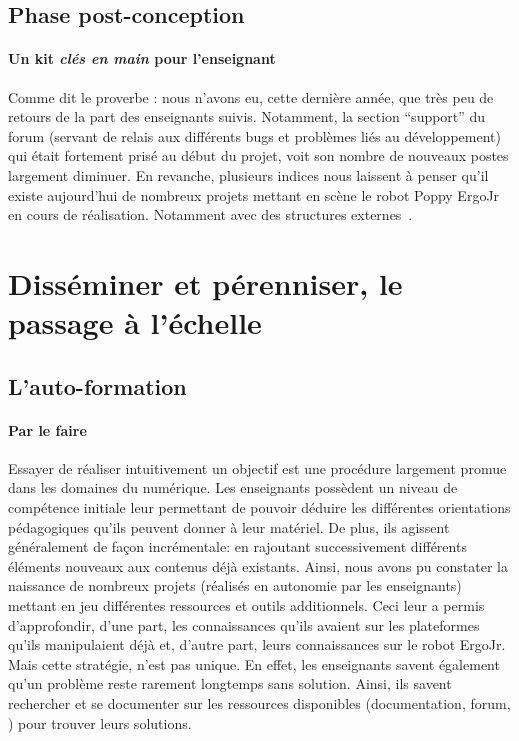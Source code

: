     \subsection{Phase post-conception}
      \paragraph{Un kit \textit{clés en main} pour l'enseignant}
        Comme dit le proverbe : nous n'avons eu, cette dernière année, que très peu de retours de la part des enseignants suivis. Notamment, la section “support” du forum (servant de relais aux différents bugs et problèmes liés au développement) qui était fortement prisé au début du projet, voit son nombre de nouveaux postes largement diminuer. En revanche, plusieurs indices nous laissent à penser qu'il existe aujourd'hui de nombreux projets mettant en scène le robot Poppy ErgoJr en cours de réalisation. Notamment avec des structures externes~.
\section[Disséminer et pérenniser]{Disséminer et pérenniser, le passage à l'échelle}
    \subsection{L'auto-formation}
        \paragraph{Par le faire}
            Essayer de réaliser intuitivement  un objectif est une procédure largement promue dans les domaines du numérique. Les enseignants possèdent un niveau de compétence initiale leur permettant de pouvoir déduire les différentes orientations pédagogiques qu'ils peuvent donner à leur matériel. De plus, ils agissent généralement de façon incrémentale: en rajoutant successivement différents éléments nouveaux aux contenus déjà existants. Ainsi, nous avons pu constater la naissance de nombreux projets (réalisés en autonomie par les enseignants) mettant en jeu différentes ressources et outils additionnels. Ceci leur a permis d'approfondir, d'une part, les connaissances qu'ils avaient sur les plateformes qu'ils manipulaient déjà et, d'autre part, leurs connaissances sur le robot ErgoJr. 
            Mais cette stratégie, n'est pas unique. En effet, les enseignants savent également qu'un problème reste rarement longtemps sans solution. Ainsi, ils savent rechercher et se documenter sur les ressources disponibles (documentation, forum, \etc) pour trouver leurs solutions.
